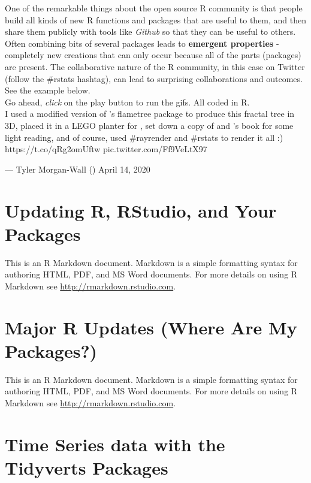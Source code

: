 \documentclass[]{book}
\begin{document}
One of the remarkable things about the open source R community is that people build all kinds of new R functions and packages that are useful to them, and then share them publicly with tools like \emph{Github} so that they can be useful to others. Often combining bits of several packages leads to \textbf{emergent properties} - completely new creations that can only occur because all of the parts (packages) are present. The collaborative nature of the R community, in this case on Twitter (follow the \#rstats hashtag), can lead to surprising collaborations and outcomes.\\
See the example below.\\
Go ahead, \emph{click} on the play button to run the gifs. All coded in R.\\

I used a modified version of \citet{djnavarro}'s flametree package to produce this fractal tree in 3D, placed it in a LEGO planter for \citet{ryantimpe}, set down a copy of \citet{skyetetra} and \citet{robinson_es}'s book for some light reading, and of course, used \#rayrender and \#rstats to render it all :) https://t.co/qRg2omUftw pic.twitter.com/Ff9VeLtX97

--- Tyler Morgan-Wall (\citet{tylermorganwall}) April 14, 2020

\hypertarget{updating-r-rstudio-and-your-packages}{%
\chapter{Updating R, RStudio, and Your Packages}\label{updating-r-rstudio-and-your-packages}}

This is an R Markdown document. Markdown is a simple formatting syntax for authoring HTML, PDF, and MS Word documents. For more details on using R Markdown see \url{http://rmarkdown.rstudio.com}.

\hypertarget{major-r-updates-where-are-my-packages}{%
\chapter{Major R Updates (Where Are My Packages?)}\label{major-r-updates-where-are-my-packages}}

This is an R Markdown document. Markdown is a simple formatting syntax for authoring HTML, PDF, and MS Word documents. For more details on using R Markdown see \url{http://rmarkdown.rstudio.com}.

\hypertarget{time-series-data-with-the-tidyverts-packages}{%
\chapter{Time Series data with the Tidyverts Packages}\label{time-series-data-with-the-tidyverts-packages}}
\end{document}
